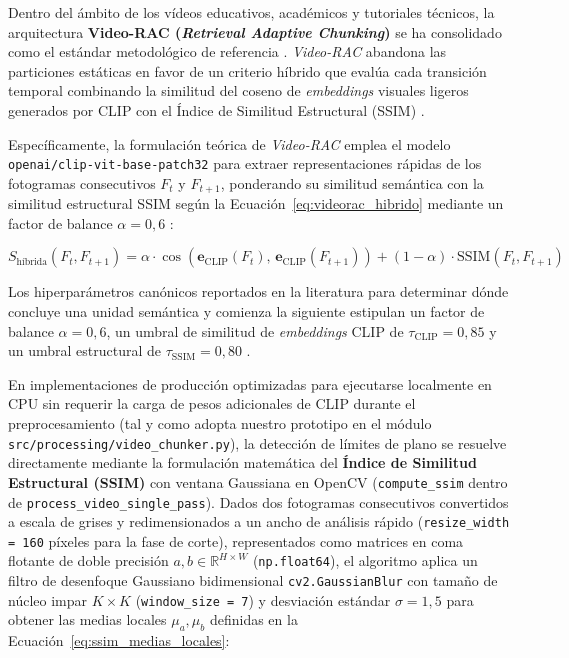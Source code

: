 Dentro del ámbito de los vídeos educativos, académicos y tutoriales técnicos, la arquitectura \textbf{Video-RAC (\textit{Retrieval Adaptive Chunking})} se ha consolidado como el estándar metodológico de referencia \cite{video_rac2025}. %
\textit{Video-RAC} abandona las particiones estáticas en favor de un criterio híbrido que evalúa cada transición temporal combinando la similitud del coseno de \textit{embeddings} visuales ligeros generados por CLIP con el Índice de Similitud Estructural (SSIM) \cite{video_rac2025}. %

Específicamente, la formulación teórica de \textit{Video-RAC} emplea el modelo \texttt{openai/clip-vit-base-patch32} \cite{radford2021clip} para extraer representaciones rápidas de los fotogramas consecutivos $F_t$ y $F_{t+1}$, ponderando su similitud semántica con la similitud estructural SSIM \cite{wang2004ssim} según la Ecuación~\eqref{eq:videorac_hibrido} mediante un factor de balance $\alpha = 0,6$ \cite{video_rac2025}: %

\begin{equation}
S_{\text{híbrida}}(F_t, F_{t+1}) = \alpha \cdot \cos\!\left(\mathbf{e}_{\text{CLIP}}(F_t), \, \mathbf{e}_{\text{CLIP}}(F_{t+1})\right) + (1 - \alpha) \cdot \text{SSIM}(F_t, F_{t+1})
\label{eq:videorac_hibrido}
\end{equation} %

Los hiperparámetros canónicos reportados en la literatura para determinar dónde concluye una unidad semántica y comienza la siguiente estipulan un factor de balance $\alpha = 0,6$, un umbral de similitud de \textit{embeddings} CLIP de $\tau_{\text{CLIP}} = 0,85$ y un umbral estructural de $\tau_{\text{SSIM}} = 0,80$ \cite{video_rac2025}. %

En implementaciones de producción optimizadas para ejecutarse localmente en CPU sin requerir la carga de pesos adicionales de CLIP durante el preprocesamiento (tal y como adopta nuestro prototipo en el módulo \texttt{src/processing/video\_chunker.py}), la detección de límites de plano se resuelve directamente mediante la formulación matemática del \textbf{Índice de Similitud Estructural (SSIM)} \cite{wang2004ssim} con ventana Gaussiana en OpenCV (\texttt{compute\_ssim} dentro de \texttt{process\_video\_single\_pass}). %
Dados dos fotogramas consecutivos convertidos a escala de grises y redimensionados a un ancho de análisis rápido (\texttt{resize\_width = 160} píxeles para la fase de corte), representados como matrices en coma flotante de doble precisión $a, b \in \mathbb{R}^{H \times W}$ (\texttt{np.float64}), el algoritmo aplica un filtro de desenfoque Gaussiano bidimensional \texttt{cv2.GaussianBlur} con tamaño de núcleo impar $K \times K$ (\texttt{window\_size = 7}) y desviación estándar $\sigma = 1,5$ para obtener las medias locales $\mu_a, \mu_b$ definidas en la Ecuación~\eqref{eq:ssim_medias_locales}: %

